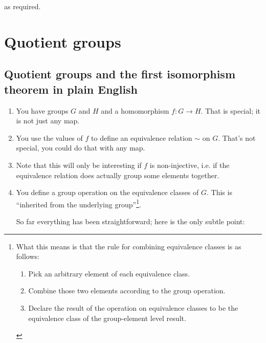 as required.
\newcommand{\textstack}[2]{
  \left(\begin{array}{c}
    \text{#1}  \\
    \text{#2}
  \end{array}\right)
}

\section{Quotient groups}

\subsection{Quotient groups and the first isomorphism theorem in plain English}
\begin{enumerate}
\item You have groups $G$ and $H$ and a homomorphism $f:G \to H$. That is special; it is not just
  any map.
\item You use the values of $f$ to define an equivalence relation $\sim$ on $G$. That's not
  special, you could do that with any map.
\item Note that this will only be interesting if $f$ is non-injective, i.e. if the equivalence
  relation does actually group some elements together.
\item You define a group operation on the equivalence classes of $G$. This is ``inherited from the
  underlying group''\footnote{ What this means is that the rule for combining equivalence classes
    is as follows:
  \begin{enumerate}
  \item Pick an arbitrary element of each equivalence class.
  \item Combine those two elements according to the group operation.
  \item Declare the result of the operation on equivalence classes to be the equivalence class of
    the group-element level result.
  \end{enumerate}
}.

So far everything has been straightforward; here is the only subtle point:


\end{enumerate}
